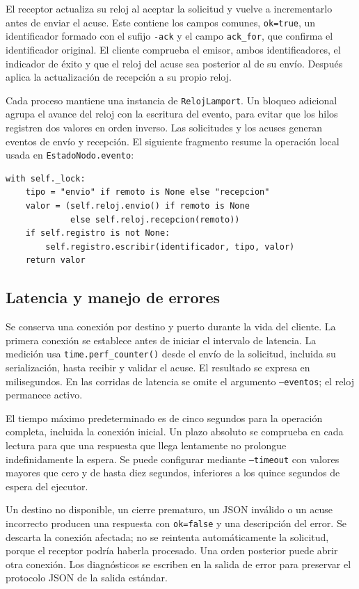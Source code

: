 El receptor actualiza su reloj al aceptar la solicitud y vuelve a
incrementarlo antes de enviar el acuse. Este contiene los campos comunes,
\texttt{ok=true}, un identificador formado con el sufijo \texttt{-ack}
y el campo \texttt{ack\_for}, que confirma el identificador original.
El cliente comprueba el emisor, ambos identificadores, el indicador de
éxito y que el reloj del acuse sea posterior al de su envío. Después
aplica la actualización de recepción a su propio reloj.

Cada proceso mantiene una instancia de \texttt{RelojLamport}. Un bloqueo
adicional agrupa el avance del reloj con la escritura del evento, para
evitar que los hilos registren dos valores en orden inverso. Las solicitudes
y los acuses generan eventos de envío y recepción. El siguiente fragmento
resume la operación local usada en \texttt{EstadoNodo.evento}:

\begin{verbatim}
with self._lock:
    tipo = "envio" if remoto is None else "recepcion"
    valor = (self.reloj.envio() if remoto is None
             else self.reloj.recepcion(remoto))
    if self.registro is not None:
        self.registro.escribir(identificador, tipo, valor)
    return valor
\end{verbatim}

\subsection{Latencia y manejo de errores}

Se conserva una conexión por destino y puerto durante la vida del cliente.
La primera conexión se establece antes de iniciar el intervalo de latencia.
La medición usa \texttt{time.perf\_counter()} desde el envío de la solicitud,
incluida su serialización, hasta recibir y validar el acuse. El resultado
se expresa en milisegundos. En las corridas de latencia se omite el argumento
\texttt{--eventos}; el reloj permanece activo.

El tiempo máximo predeterminado es de cinco segundos para la operación
completa, incluida la conexión inicial. Un plazo absoluto se comprueba
en cada lectura para que una respuesta que llega lentamente no prolongue
indefinidamente la espera. Se puede configurar mediante \texttt{--timeout}
con valores mayores que cero y de hasta diez segundos, inferiores a los
quince segundos de espera del ejecutor.

Un destino no disponible, un cierre prematuro, un JSON inválido o un acuse
incorrecto producen una respuesta con \texttt{ok=false} y una descripción
del error. Se descarta la conexión afectada; no se reintenta automáticamente
la solicitud, porque el receptor podría haberla procesado. Una orden
posterior puede abrir otra conexión. Los diagnósticos se escriben en la
salida de error para preservar el protocolo JSON de la salida estándar.

